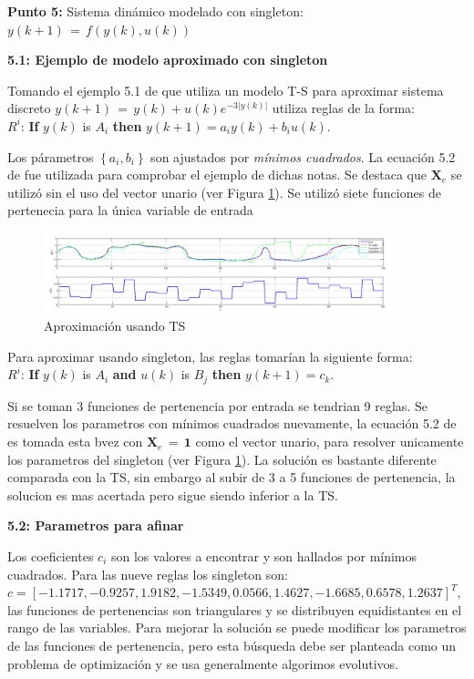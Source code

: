\documentclass[10pt,onecolumn,twoside,letterpaper]{article}
\begin{document}
\par{\bf \large Punto 5:} Sistema dinámico modelado con singleton: $y(k+1)\,=\,f(y(k),u(k))$\\
\par{\bf 5.1: Ejemplo de modelo aproximado con singleton}
\par Tomando el ejemplo 5.1 de \cite{Babuska1999} que utiliza un modelo T-S para aproximar sistema discreto $y(k+1)\,=\,y(k)+u(k)e^{-3\left|y(k)\right|}$ utiliza reglas de la forma:\\
$R^{i}$: \textbf{If} $y(k)$ is $A_{i}$ \textbf{then} $y(k+1)=a_iy(k)+b_iu(k)$.
\par Los p\'arametros $\left\{a_i,b_i\right\}$ son ajustados por \emph{m\'inimos cuadrados}. La ecuaci\'on 5.2 de \cite{Babuska1999} fue utilizada para comprobar el ejemplo de dichas notas. Se destaca que $\mathbf{X}_e$ se utiliz\'o sin el uso del vector unario (ver Figura \ref{fig:AproxTS}). Se utiliz\'o siete funciones de pertenecia para la \'unica variable de entrada
\begin{figure}[!htb]
  \centering
  \includegraphics[width=0.9\textwidth]{ApproxTS5-1.png}
  \caption{Aproximaci\'on usando TS}
  \label{fig:AproxTS}
\end{figure}

\par Para aproximar usando singleton, las reglas tomar\'ian la siguiente forma:\\
$R^{i}$: \textbf{If} $y(k)$ is $A_{i}$ \textbf{and} $u(k)$ is $B_{j}$ \textbf{then} $y(k+1)=c_k$.\\
\par Si se toman 3 funciones de pertenencia por entrada se tendrian 9 reglas. Se resuelven los parametros con m\'inimos cuadrados nuevamente, la ecuaci\'on 5.2 de \cite{Babuska1999} es tomada esta bvez con $\mathbf{X}_e\,=\,\mathbf{1}$ como el vector unario, para resolver unicamente los parametros del singleton (ver Figura \ref{fig:AproxTS}). La soluci\'on es bastante diferente comparada con la TS, sin embargo al subir de 3 a 5 funciones de pertenencia, la solucion es mas acertada pero sigue siendo inferior a la TS.\\
\par{\bf 5.2: Parametros para afinar}
\par Los coeficientes $c_i$ son los valores a encontrar y son hallados por m\'inimos cuadrados. Para las nueve reglas los singleton son: $c=[-1.1717,-0.9257, 1.9182,-1.5349, 0.0566, 1.4627,-1.6685, 0.6578, 1.2637]^T$, las funciones de pertenencias son triangulares y se distribuyen equidistantes en el rango de las variables. Para mejorar la soluci\'on se puede modificar los parametros de las funciones de pertenencia, pero esta b\'usqueda debe ser planteada como un problema de optimizaci\'on y se usa generalmente algorimos evolutivos. 
\end{document}
